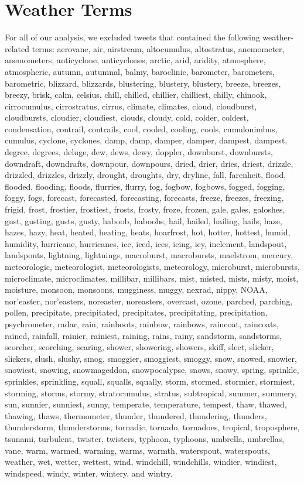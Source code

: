 \documentclass{article}
\begin{document}
\newpage
\section{Weather Terms}
For all of our analysis, we excluded tweets that contained the following weather-related terms: aerovane, air, airstream, altocumulus, altostratus, anemometer, anemometers, anticyclone, anticyclones, arctic, arid, aridity, atmosphere, atmospheric, autumn, autumnal, balmy, baroclinic, barometer, barometers, barometric, blizzard, blizzards, blustering, blustery, blustery, breeze, breezes, breezy, brisk, calm, celsius, chill, chilled, chillier, chilliest, chilly, chinook, cirrocumulus, cirrostratus, cirrus, climate, climates, cloud, cloudburst, cloudbursts, cloudier, cloudiest, clouds, cloudy, cold, colder, coldest, condensation, contrail, contrails, cool, cooled, cooling, cools, cumulonimbus, cumulus, cyclone, cyclones, damp, damp, damper, damper, dampest, dampest, degree, degrees, deluge, dew, dews, dewy, doppler, downburst, downbursts, downdraft, downdrafts, downpour, downpours, dried, drier, dries, driest, drizzle, drizzled, drizzles, drizzly, drought, droughts, dry, dryline, fall, farenheit, flood, flooded, flooding, floods, flurries, flurry, fog, fogbow, fogbows, fogged, fogging, foggy, fogs, forecast, forecasted, forecasting, forecasts, freeze, freezes, freezing, frigid, frost, frostier, frostiest, frosts, frosty, froze, frozen, gale, gales, galoshes, gust, gusting, gusts, gusty, haboob, haboobs, hail, hailed, hailing, hails, haze, hazes, hazy, heat, heated, heating, heats, hoarfrost, hot, hotter, hottest, humid, humidity, hurricane, hurricanes, ice, iced, ices, icing, icy, inclement, landspout, landspouts, lightning, lightnings, macroburst, macrobursts, maelstrom, mercury, meteorologic, meteorologist, meteorologists, meteorology, microburst, microbursts, microclimate, microclimates, millibar, millibars, mist, misted, mists, misty, moist, moisture, monsoon, monsoons, mugginess, muggy, nexrad, nippy, NOAA, nor'easter, nor'easters, noreaster, noreasters, overcast, ozone, parched, parching, pollen, precipitate, precipitated, precipitates, precipitating, precipitation, psychrometer, radar, rain, rainboots, rainbow, rainbows, raincoat, raincoats, rained, rainfall, rainier, rainiest, raining, rains, rainy, sandstorm, sandstorms, scorcher, scorching, searing, shower, showering, showers, skiff, sleet, slicker, slickers, slush, slushy, smog, smoggier, smoggiest, smoggy, snow, snowed, snowier, snowiest, snowing, snowmageddon, snowpocalypse, snows, snowy, spring, sprinkle, sprinkles, sprinkling, squall, squalls, squally, storm, stormed, stormier, stormiest, storming, storms, stormy, stratocumulus, stratus, subtropical, summer, summery, sun, sunnier, sunniest, sunny, temperate, temperature, tempest, thaw, thawed, thawing, thaws, thermometer, thunder, thundered, thundering, thunders, thunderstorm, thunderstorms, tornadic, tornado, tornadoes, tropical, troposphere, tsunami, turbulent, twister, twisters, typhoon, typhoons, umbrella, umbrellas, vane, warm, warmed, warming, warms, warmth, waterspout, waterspouts, weather, wet, wetter, wettest, wind, windchill, windchills, windier, windiest, windspeed, windy, winter, wintery, and wintry.


\printbibliography
\end{document}
